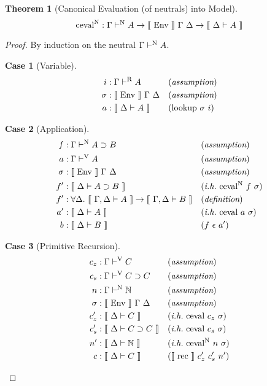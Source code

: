 \documentclass[preprint,nonatbib]{sigplanconf}
\numberwithin{subdefin}{defin}
\theoremstyle{definition}
\newtheorem{subtheorem}{Theorem}
\numberwithin{subtheorem}{theorem}
\numberwithin{sublemma}{theorem}
\numberwithin{corollary}{theorem}
\numberwithin{case}{theorem}
\numberwithin{slcase}{sublemma}
\newtheorem{scase}{Case}
\numberwithin{scase}{subtheorem}
\numberwithin{lcase}{lemma}
\def\arr{\supset}
\def\marr{\rightarrow}
\def\nat{\mathbb{N}}
\def\emp{\epsilon}
\def\rec{\fun{rec}}
\def\cevalv{\fun{ceval}}
\def\cevaln{\fun{ceval}^\con{N}}
\def\lookup{\fun{lookup}}
\def\bydef{(\textit{definition})}
\def\byass{(\textit{assumption})}
\newcommand{\ih}[1]{(\textit{i.h.}~ #1)}
\newcommand{\by}[1]{(#1)}
\newcommand{\turn}[1]{\vdash^\con{#1}}
\newcommand{\all}[1]{\forall#1.~}
\newcommand{\el}[1]{\llbracket ~ #1 ~ \rrbracket}
\newcommand{\con}[1]{\textmd{#1}}
\newcommand{\fun}[1]{\textmd{#1}}
\newcommand{\dtypm}[1]{\el{\Delta \vdash #1}}
\newcommand{\gdtypm}[1]{\el{\Gamma, \Delta \vdash #1}}
\newcommand{\typv}[1]{\Gamma \turn{V} #1}
\newcommand{\typn}[1]{\Gamma \turn{N} #1}
\newcommand{\typr}[1]{\Gamma \turn{R} #1}
\def\menv{\el{\fun{Env}}~\Gamma~\Delta}
\begin{document}
\begin{subtheorem}[Canonical Evaluation (of neutrals) into Model]
\label{thm:mod:cevaln}
$$
\cevaln : \typn{A} \marr \menv \marr \dtypm{A}
$$

\begin{proof}

By induction on the neutral $\typn{A}$.

\begin{scase}[Variable]
\begin{align*}
i   &: \typr{A} && \byass\\
\sigma  &: \menv && \byass\\
a  &: \dtypm{A} && \by{\lookup~\sigma~i}
\end{align*}
\end{scase}

\begin{scase}[Application]
\begin{align*}
f   &: \typn{A \arr B} && \byass\\
a   &: \typv{A} && \byass\\
\sigma  &: \menv && \byass\\
f'  &: \dtypm{A \arr B} && \ih{\cevaln~f~\sigma}\\
f'  &: \all{\Delta} \gdtypm{A} \marr \gdtypm{B} && \bydef\\
a'  &: \dtypm{A} && \ih{\cevalv~a~\sigma}\\
b   &: \dtypm{B} && \by{f~\emp~a'}
\end{align*}
\end{scase}

\begin{scase}[Primitive Recursion]
\begin{align*}
c_z  &: \typv{C} && \byass\\
c_s  &: \typv{C \arr C} && \byass\\
n    &: \typn{\nat} && \byass\\
\sigma  &: \menv && \byass\\
c_z' &: \dtypm{C} && \ih{\cevalv~c_z~\sigma}\\
c_s' &: \dtypm{C \arr C} && \ih{\cevalv~c_s~\sigma}\\
n'   &: \dtypm{\nat} && \ih{\cevaln~n~\sigma}\\
c    &: \dtypm{C} && \by{\el{\rec}~c_z'~c_s'~n'}
\end{align*}
\end{scase}

\end{proof}



\end{subtheorem}
\end{document}
